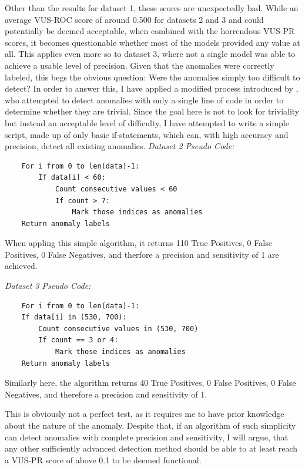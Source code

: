 \documentclass[12pt,oneside]{article}
\begin{document}
Other than the results for dataset 1, these scores are unexpectedly bad. While an average VUS-ROC score of around 0.500 for datasets 2 and 3 and could potentially be deemed acceptable, when combined with the horrendous VUS-PR scores, it becomes questionable whether most of the models provided any value at all. This applies even more so to dataset 3, where not a single model was able to achieve a usable level of precision. Given that the anomalies were correctly labeled, this begs the obvious question: Were the anomalies simply too difficult to detect? In order to answer this, I have applied a modified process introduced by \cite{wu2021current}, who attempted to detect anomalies with only a single line of code in order to determine whether they are trivial. Since the goal here is not to look for triviality but instead an acceptable level of difficulty, I have attempted to write a simple script, made up of only basic if-statements, which can, with high accuracy and precision, detect all existing anomalies.
\textit{Dataset 2 Pseudo Code:} \par
\begin{lstlisting}
    For i from 0 to len(data)-1:
        If data[i] < 60:
            Count consecutive values < 60
            If count > 7:
                Mark those indices as anomalies
    Return anomaly labels
\end{lstlisting}
\par
When appling this simple algorithm, it returns 110 True Positives, 0 False Positives, 0 False Negatives, and therfore a precision and sensitivity of 1 are achieved.\par
\textit{Dataset 3 Pseudo Code:} \par
\begin{lstlisting}
    For i from 0 to len(data)-1:
    If data[i] in (530, 700):
        Count consecutive values in (530, 700)
        If count == 3 or 4:
            Mark those indices as anomalies
    Return anomaly labels
\end{lstlisting}
\par
Similarly here, the algorithm returns 40 True Positives, 0 False Positives, 0 False Negatives, and therefore a precision and sensitivity of 1. \par
This is obviously not a perfect test, as it requires me to have prior knowledge about the nature of the anomaly. Despite that, if an algorithm of such simplicity can detect anomalies with complete precision and sensitivity, I will argue, that any other sufficiently advanced detection method should be able to at least reach a VUS-PR score of above 0.1 to be deemed functional.\par
\end{document}
